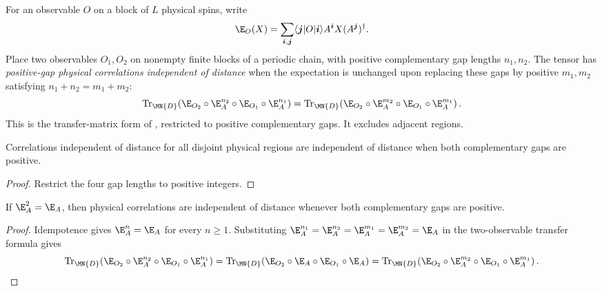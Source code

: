 \begin{definition}%
    \label{def:is_positive_gap_physical_cid}
    \leanok
    For an observable $O$ on a block of $L$ physical spins, write
    \[
        \E_O(X)=\sum_{\boldsymbol i,\boldsymbol j}
        \langle\boldsymbol j|O|\boldsymbol i\rangle
        A^{\boldsymbol i}X(A^{\boldsymbol j})^\dagger .
    \]
    Place two observables $O_1,O_2$ on nonempty finite blocks of a periodic
    chain, with positive complementary gap lengths $n_1,n_2$. The tensor has
    \emph{positive-gap physical correlations independent of distance} when the expectation
    is unchanged upon replacing these gaps by positive $m_1,m_2$ satisfying
    $n_1+n_2=m_1+m_2$:
    \[
      \operatorname{Tr}_{\MN{D}}\!\left(
        \E_{O_2}\circ\E_A^{n_2}\circ\E_{O_1}\circ\E_A^{n_1}\right)
      =
      \operatorname{Tr}_{\MN{D}}\!\left(
        \E_{O_2}\circ\E_A^{m_2}\circ\E_{O_1}\circ\E_A^{m_1}\right).
    \]
    This is the transfer-matrix form of
    \cite[Definition~3.3 and the correlation formula preceding
    Theorem~3.8]{Cirac2016MPDO_arXiv}, restricted to positive complementary
    gaps.  It excludes adjacent regions.
\end{definition}

\begin{lemma}%
    \label{lem:is_positive_gap_physical_cid_of_physical_cid}
    \leanok
    Correlations independent of distance for all disjoint physical regions are
    independent of distance when both complementary gaps are positive.
\end{lemma}
\begin{proof}\leanok
    Restrict the four gap lengths to positive integers.
\end{proof}

\begin{theorem}%
    \label{thm:is_positive_gap_physical_cid_of_is_rfp}
    \leanok
    If $\E_A^2=\E_A$, then physical correlations are independent of distance
    whenever both complementary gaps are positive.
\end{theorem}
\begin{proof}\leanok
    Idempotence gives $\E_A^n=\E_A$ for every $n\geq1$.  Substituting
    $\E_A^{n_1}=\E_A^{n_2}=\E_A^{m_1}=\E_A^{m_2}=\E_A$ in the two-observable
    transfer formula gives
    \[
      \operatorname{Tr}_{\MN{D}}\!\left(
        \E_{O_2}\circ\E_A^{n_2}\circ\E_{O_1}\circ\E_A^{n_1}\right)
      =
      \operatorname{Tr}_{\MN{D}}\!\left(
        \E_{O_2}\circ\E_A\circ\E_{O_1}\circ\E_A\right)
      =
      \operatorname{Tr}_{\MN{D}}\!\left(
        \E_{O_2}\circ\E_A^{m_2}\circ\E_{O_1}\circ\E_A^{m_1}\right).
    \]
\end{proof}


